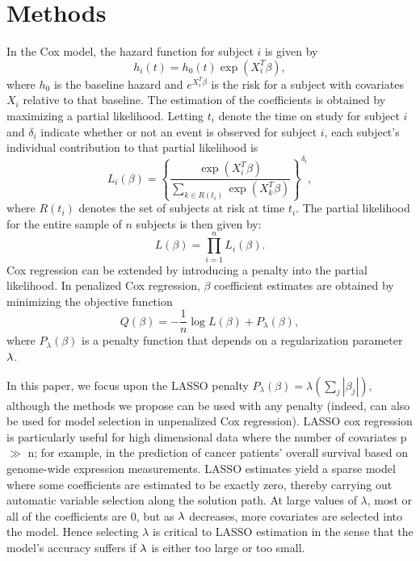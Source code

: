 \section{Methods}

\par In the Cox model, the hazard function for subject $i$ is given by 
\begin{equation*}
  h_{i}(t) = h_{0}(t) \exp( X_{i}^{T} \beta),
\end{equation*} 
where $h_{0}$ is the baseline hazard and $e^{X_i^{T} \beta}$ is the risk for a subject with covariates $X_i$ relative to that baseline.  The estimation of the coefficients is obtained by maximizing a partial likelihood.  Letting $t_i$ denote the time on study for subject $i$ and $\delta_{i}$ indicate whether or not an event is observed for subject $i$, each subject's individual contribution to that partial likelihood is
\begin{equation*}
  L_{i}(\beta) = \left \{\frac{\exp ( X_{i}^{T} \beta)}{\sum_{ k \in R(t_{i})}\exp ( X_{k}^{T} \beta)}\right \}^{\delta_{i}},
\end{equation*}
where $R(t_{i})$ denotes the set of subjects at risk at time $t_{i}$.  The partial likelihood for the entire sample of $n$ subjects is then given by:
\begin{equation*}
  L(\beta) =\prod_{i = 1}^{n} L_{i}(\beta).
\end{equation*}
Cox regression can be extended by introducing a penalty into the partial likelihood.  In penalized Cox regression, $\beta$ coefficient estimates are obtained by minimizing the objective function
\begin{equation}
  \label{eq:obj}
  Q(\beta) = - \frac{1}{n} \log L(\beta) + P_{\lambda}(\beta),
\end{equation}
where $P_{\lambda}(\beta)$ is a penalty function that depends on a regularization parameter $\lambda$. 

\par In this paper, we focus upon the LASSO penalty $P_{\lambda}(\beta) = \lambda (\sum_{j} |\beta_{j}|)$, although the methods we propose can be used with any penalty (indeed, can also be used for model selection in unpenalized Cox regression). LASSO cox regression is particularly useful for high dimensional data where the number of covariates p $\gg$ n; for example, in the prediction of cancer patients' overall survival based on genome-wide expression measurements. LASSO estimates yield a sparse model where some coefficients are estimated to be exactly zero, thereby carrying out automatic variable selection along the solution path. At large values of $\lambda$, most or all of the coefficients are 0, but as $\lambda$ decreases, more covariates are selected into the model. Hence selecting $\lambda$ is critical to LASSO estimation in the sense that the model's accuracy suffers if $\lambda$ is either too large or too small.

